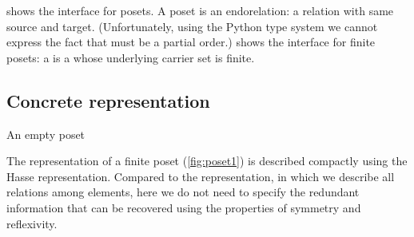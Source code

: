 
 shows the interface for posets.
A poset is an endorelation: a relation with same source and target.
(Unfortunately, using the Python type system we cannot express the fact that  must be a partial order.)
 shows the interface for finite posets:
a  is a  whose underlying carrier set is finite.




\begin{figure}[h!]
    \caption{}
    \label{fig:poset-finiteposet}
\end{figure}

\subsection{Concrete representation}
\begin{marginfigure}
    \caption{}
    \label{fig:poset1}
\end{marginfigure}
\begin{marginfigure}
    \caption{An empty poset}
    \label{fig:poset_empty}
\end{marginfigure}

The representation of a finite poset (\cref{fig:poset1}) is described compactly using the Hasse representation.
Compared to the  representation, in which we describe all relations among elements, here we do not need to specify the redundant information that can be recovered using the properties of symmetry and reflexivity.


